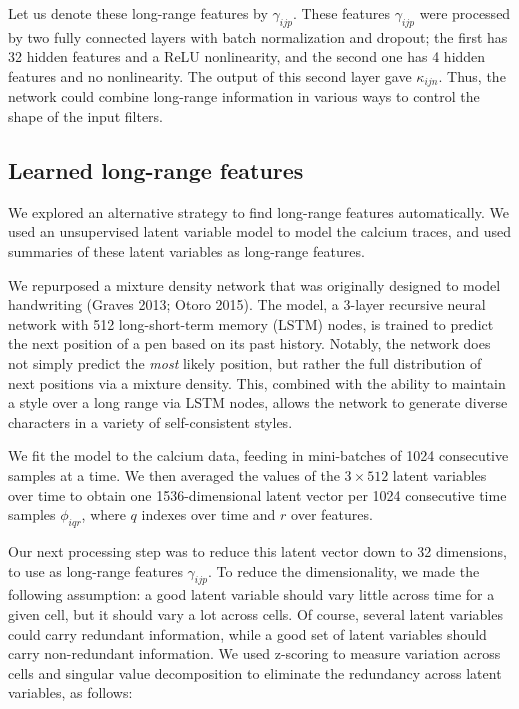 \documentclass[]{article}
\begin{document}
Let us denote these long-range features by \(\gamma_{ijp}\). These
features \(\gamma_{ijp}\) were processed by two fully connected layers
with batch normalization and dropout; the first has 32 hidden features
and a ReLU nonlinearity, and the second one has 4 hidden features and no
nonlinearity. The output of this second layer gave \(\kappa_{ijn}\).
Thus, the network could combine long-range information in various ways
to control the shape of the input filters.

\subsection{Learned long-range
features}\label{learned-long-range-features}

We explored an alternative strategy to find long-range features
automatically. We used an unsupervised latent variable model to model
the calcium traces, and used summaries of these latent variables as
long-range features.

We repurposed a mixture density network that was originally designed to
model handwriting (Graves 2013; Otoro 2015). The model, a 3-layer
recursive neural network with 512 long-short-term memory (LSTM) nodes,
is trained to predict the next position of a pen based on its past
history. Notably, the network does not simply predict the \emph{most}
likely position, but rather the full distribution of next positions via
a mixture density. This, combined with the ability to maintain a style
over a long range via LSTM nodes, allows the network to generate diverse
characters in a variety of self-consistent styles.

We fit the model to the calcium data, feeding in mini-batches of 1024
consecutive samples at a time. We then averaged the values of the
\(3 \times 512\) latent variables over time to obtain one
1536-dimensional latent vector per 1024 consecutive time samples
\(\phi_{iqr}\), where \(q\) indexes over time and \(r\) over features.

Our next processing step was to reduce this latent vector down to 32
dimensions, to use as long-range features \(\gamma_{ijp}\). To reduce
the dimensionality, we made the following assumption: a good latent
variable should vary little across time for a given cell, but it should
vary a lot across cells. Of course, several latent variables could carry
redundant information, while a good set of latent variables should carry
non-redundant information. We used z-scoring to measure variation across
cells and singular value decomposition to eliminate the redundancy
across latent variables, as follows:
\end{document}
